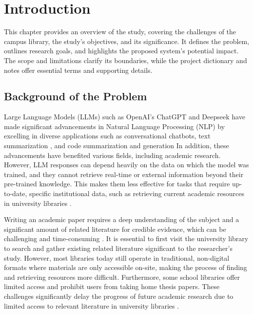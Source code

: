 
\chapter{Introduction}
\begin{refsection}

\hspace{1cm}This chapter provides an overview of the study, covering the challenges of the campus library, the study’s objectives, and its significance. It defines the problem, outlines research goals, and highlights the proposed system’s potential impact. The scope and limitations clarify its boundaries, while the project dictionary and notes offer essential terms and supporting details. 

\section{Background of the Problem}
\hspace{1cm}Large Language Models (LLMs) such as OpenAI's ChatGPT \cite{achiam2023gpt}  and Deepseek \cite{guo2025deepseek} have made significant advancements in Natural Language Processing (NLP) by excelling in diverse applications such as conversational chatbots, text summarization \cite{lewis2019bart}, and code summarization and generation \cite{nijkamp2022codegen,chen2021evaluating}
 In addition, these advancements have benefited various fields, including academic research. However, LLM responses can depend heavily on the data on which the model was trained, and they cannot retrieve real-time or external information beyond their pre-trained knowledge. This makes them less effective for tasks that require up-to-date, specific institutional data, such as retrieving current academic resources in university libraries \cite{liu2024information}.

\bigbreak
\hspace{0.4cm}Writing an academic paper requires a deep understanding of the subject and a significant amount of related literature for credible evidence, which can be challenging and time-consuming \cite{khalifa2024using}. It is essential to first visit the university library to search and gather existing related literature significant to the researcher’s study.  However, most libraries today still operate in traditional, non-digital formats where materials are only accessible on-site, making the process of finding and retrieving resources more difficult. Furthermore, some school libraries offer limited access and prohibit users from taking home thesis papers. These challenges significantly delay the progress of future academic research due to limited access to relevant literature in university libraries \cite{prajapat2022comparative}. 


\end{refsection}
